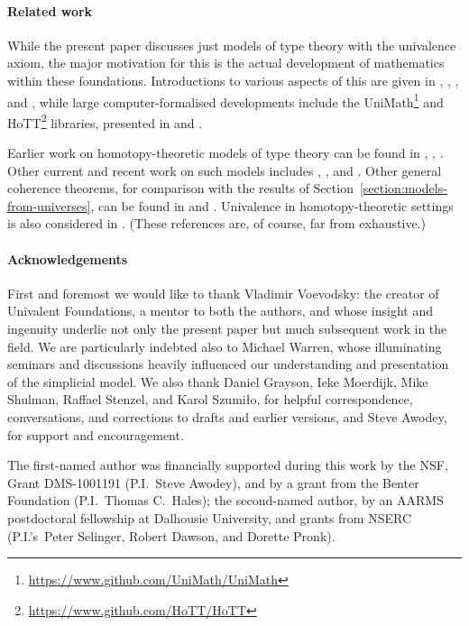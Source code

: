 \paragraph*{Related work}
While the present paper discusses just models of type theory with the univalence axiom, the major motivation for this is the actual development of mathematics within these foundations. Introductions to various aspects of this are given in \cite{grayson:intro-to-univalent-foundations}, \cite{voevodsky:experimental-library}, \cite{pelayo-warren:univalent-foundations-paper}, and \cite{hott:book},
while large computer-formalised developments include the UniMath\footnote{\url{https://www.github.com/UniMath/UniMath}} and HoTT\footnote{\url{https://www.github.com/HoTT/HoTT}} libraries, presented in \cite{voevodsky-ahrens-grayson:unimath} and \cite{bauer-et-al:hott-library}.

Earlier work on homotopy-theoretic models of type theory can be found in \cite{hofmann-streicher}, \cite{awodey-warren}, \cite{warren:strict-w-groupoid-model}.  Other current and recent work on such models includes \cite{garner-van-den-berg}, \cite{arndt-kapulkin}, and \cite{shulman:inverse-diagrams}.  Other general coherence theorems, for comparison with the results of Section~\ref{section:models-from-universes}, can be found in \cite{hofmann:on-the-interpretation} and \cite{lumsdaine-warren:local-universes}.  Univalence in homotopy-theoretic settings is also considered in %
\cite{gepner-kock:univalence}.  (These references are, of course, far from exhaustive.)

\paragraph*{Acknowledgements} 
First and foremost we would like to thank Vladimir Voevodsky: the creator of Univalent Foundations, a mentor to both the authors, and whose insight and ingenuity underlie not only the present paper but much subsequent work in the field.
We are particularly indebted also to Michael Warren, whose illuminating seminars and discussions heavily influenced our understanding and presentation of the simplicial model.
We also thank Daniel Grayson, Ieke Moerdijk, Mike Shulman, Raffael Stenzel, and Karol Szumi{\l}o, for helpful correspondence, conversations, and corrections to drafts and earlier versions, and Steve Awodey, for support and encouragement.

The first-named author was financially supported during this work by the NSF, Grant DMS-1001191 (P.I.~Steve Awodey), and by a grant from the Benter Foundation (P.I.~Thomas C.~Hales); the second-named author, by an AARMS postdoctoral fellowship at Dalhousie University, and grants from NSERC (P.I.’s~Peter Selinger, Robert Dawson, and Dorette Pronk).

